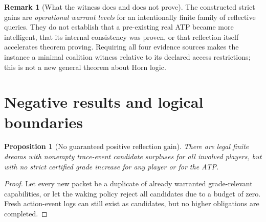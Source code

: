 \documentclass[11pt,letterpaper]{article}
\theoremstyle{definition}
\theoremstyle{plain}
\newtheorem{proposition}[definition]{Proposition}
\theoremstyle{definition}
\newtheorem{remark}[definition]{Remark}
\begin{document}
\begin{center}
\end{center}

\begin{remark}[What the witness does and does not prove]
The constructed strict gains are \emph{operational warrant levels} for an intentionally finite family of reflective queries. They do not establish that a pre-existing real ATP became more intelligent, that its internal consistency was proven, or that reflection itself accelerates theorem proving. Requiring all four evidence sources makes the instance a minimal coalition witness relative to its declared access restrictions; this is not a new general theorem about Horn logic.
\end{remark}

\section{Negative results and logical boundaries}\label{gl-first-W0-s13}
\begin{proposition}[No guaranteed positive reflection gain]
There are legal finite dreams with nonempty trace-event candidate surpluses for all involved players, but with no strict certified grade increase for any player or for the ATP.
\end{proposition}
\begin{proof}Let every new packet be a duplicate of already warranted grade-relevant capabilities, or let the waking policy reject all candidates due to a budget of zero. Fresh action-event logs can still exist as candidates, but no higher obligations are completed.\end{proof}
\end{document}
